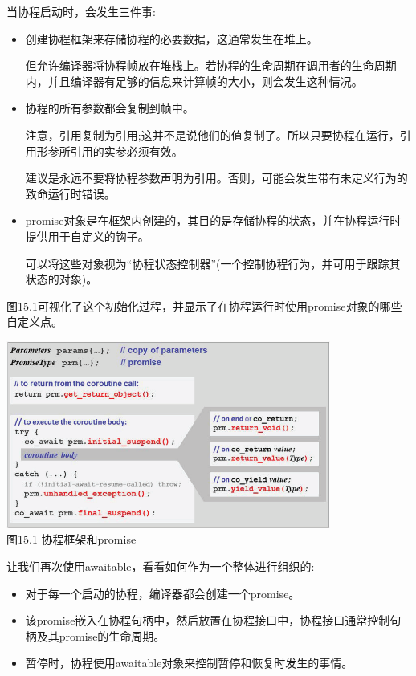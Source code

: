 
当协程启动时，会发生三件事:

\begin{itemize}
\item
创建协程框架来存储协程的必要数据，这通常发生在堆上。

但允许编译器将协程帧放在堆栈上。若协程的生命周期在调用者的生命周期内，并且编译器有足够的信息来计算帧的大小，则会发生这种情况。

\item
协程的所有参数都会复制到帧中。

注意，引用复制为引用;这并不是说他们的值复制了。所以只要协程在运行，引用形参所引用的实参必须有效。

建议是永远不要将协程参数声明为引用。否则，可能会发生带有未定义行为的致命运行时错误。

\item
promise对象是在框架内创建的，其目的是存储协程的状态，并在协程运行时提供用于自定义的钩子。

可以将这些对象视为“协程状态控制器”(一个控制协程行为，并可用于跟踪其状态的对象)。
\end{itemize}

图15.1可视化了这个初始化过程，并显示了在协程运行时使用promise对象的哪些自定义点。

\begin{center}
\includegraphics[width=0.8\textwidth]{content/chapter15/images/1.png}\\
图15.1 协程框架和promise
\end{center}


让我们再次使用awaitable，看看如何作为一个整体进行组织的:

\begin{itemize}
\item
对于每一个启动的协程，编译器都会创建一个promise。

\item
该promise嵌入在协程句柄中，然后放置在协程接口中，协程接口通常控制句柄及其promise的生命周期。

\item
暂停时，协程使用awaitable对象来控制暂停和恢复时发生的事情。
\end{itemize}

